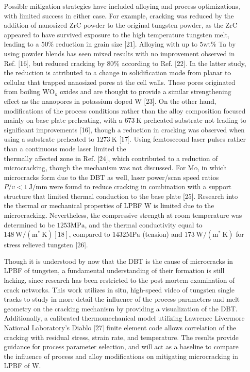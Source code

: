 \documentclass[10pt]{article}
\begin{document}
Possible mitigation strategies have included alloying and process optimizations, with limited success in either case. For example, cracking was reduced by the addition of nanosized $\mathrm{ZrC}$ powder to the original tungsten powder, as the $\mathrm{ZrC}$ appeared to have survived exposure to the high temperature tungsten melt, leading to a $50 \%$ reduction in grain size [21]. Alloying with up to $5 \mathrm{wt} \%$ Ta by using powder blends has seen mixed results with no improvement observed in Ref. [16], but reduced cracking by $80 \%$ according to Ref. [22]. In the latter study, the reduction is attributed to a change in solidification mode from planar to cellular that trapped nanosized pores at the cell walls. These pores originated from boiling $\mathrm{WO}_{\mathrm{x}}$ oxides and are thought to provide a similar strengthening effect as the nanopores in potassium doped $\mathrm{W}$ [23]. On the other hand, modifications of the process conditions rather than the alloy composition focused mainly on base plate preheating, with a $673 \mathrm{~K}$ preheated substrate not leading to significant improvements [16], though a reduction in cracking was observed when using a substrate preheated to $1273 \mathrm{~K}$ [17]. Using femtosecond laser pulses rather than a continuous mode laser limited the\\
thermally affected zone in Ref. [24], which contributed to a reduction of microcracking, though the mechanism was not discussed. For Mo, in which microcracks form due to the DBT as well, laser power/scan speed ratios $P / v<1 \mathrm{~J} / \mathrm{mm}$ were found to reduce cracking in combination with a support structure that limited thermal conduction to the base plate [25]. Research into the thermal or mechanical properties of LPBF W is limited due to the microcracking. Nevertheless, the compressive strength at room temperature was determined to be $1253 \mathrm{MPa}$, and the thermal conductivity equal to $148 \mathrm{~W} /\left(\mathrm{m}^{*} \mathrm{~K}\right)[18]$, compared to $1432 \mathrm{MPa}$ (tension) and $173 \mathrm{~W} /\left(\mathrm{m}^{*} \mathrm{~K}\right)$ for stress relieved tungsten [26].

Though it is understood by now that the DBT is the cause of microcracks in LPBF of tungsten, a fundamental understanding of their formation is still lacking, since research has been restricted to the post mortem examination of crack networks. This work utilizes in situ, high-speed video of tungsten single tracks to study in more detail the influence of the process parameters and melt geometry on the cracking mechanism by providing a visualization of the DBT. Additionally, a calibrated thermomechanical model utilizing Lawrence Livermore National Laboratory's Diablo [27] finite element code allows correlation of the cracking with residual stress, strain rate, and temperature. The results provide guidance for process parameter selection, and will act as a baseline to compare the influence of process and alloy modifications on mitigating microcracking in LPBF of $\mathrm{W}$.
\end{document}
